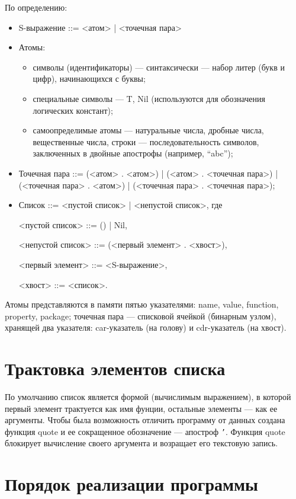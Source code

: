 \documentclass[12pt]{report}
\begin{document}
По определению:
\begin{itemize}
	\item S-выражение ::= <атом> | <точечная пара>

	\item Атомы:
\begin{itemize} 
	\item символы (идентификаторы) --- синтаксически --- набор литер (букв и цифр), начинающихся с буквы;
	\item специальные символы --- {T, Nil} (используются для обозначения логических констант);
	\item самоопределимые атомы --- натуральные числа, дробные числа, вещественные числа, строки --- последовательность символов, заключенных в двойные апострофы (например, “abc”);
\end{itemize} 


\item Точечная пара ::= (<атом> . <атом>) | (<атом> . <точечная пара>) | (<точечная пара> . <атом>) | (<точечная пара> . <точечная пара>);

\item Список ::= <пустой список> | <непустой список>, где 

<пустой список> ::= () | Nil,

<непустой список> ::= (<первый элемент> . <хвост>),

<первый элемент> ::= <S-выражение>,

<хвост> ::= <список>.

\end{itemize}

Атомы представляются в памяти пятью указателями: name, value, function, property, package; точечная пара --- списковой ячейкой (бинарным узлом), хранящей два указателя: car-указатель (на голову) и cdr-указатель (на хвост).


\section{Трактовка элементов списка}

По умолчанию список является формой (вычислимым выражением), в которой первый
элемент трактуется как имя фунции, остальные элементы --- как ее аргументы.  Чтобы была возможность отличить программу от данных создана функция quote и ее сокращенное обозначение --- апостроф \texttt{'}. Функция quote блокирует
вычисление своего аргумента и возращает его текстовую запись.


\section{Порядок реализации программы}
\end{document}
